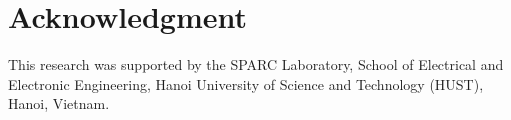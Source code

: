 \documentclass[lettersize,journal]{IEEEtran}
\begin{document}








\section*{Acknowledgment}
This research was supported by the SPARC Laboratory, School of Electrical and Electronic Engineering, Hanoi University of Science and Technology (HUST), Hanoi, Vietnam.



\end{document}
